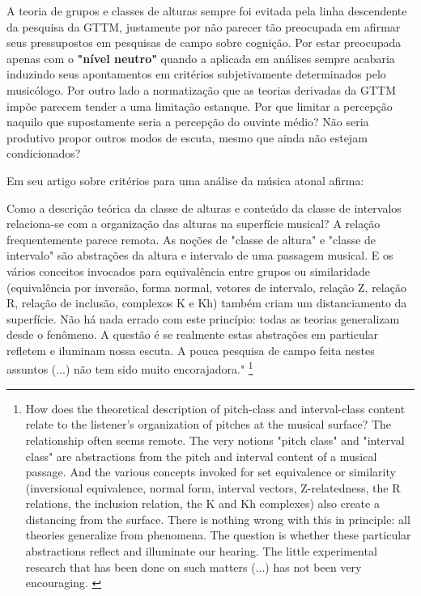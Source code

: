 \documentclass[
	12pt,				%
	openright,			%
	twoside,			%
	a4paper,			%
	english,			%
	french,				%
	spanish,			%
	brazil				%
	]{abntex2}
\begin{document}
A teoria de grupos e classes de alturas sempre foi evitada pela linha descendente da pesquisa da GTTM, justamente por não parecer tão preocupada em afirmar seus pressupostos em pesquisas de campo sobre cognição. Por estar preocupada apenas com o \textbf{"nível neutro"} quando a aplicada em análises sempre acabaria induzindo seus apontamentos em critérios subjetivamente determinados pelo musicólogo. Por outro lado a normatização que as teorias derivadas da GTTM impõe parecem tender a uma limitação estanque. Por que limitar a percepção naquilo que supostamente seria a percepção do ouvinte médio? Não seria produtivo propor outros modos de escuta, mesmo que ainda não estejam condicionados?

Em seu artigo sobre critérios para uma análise da música atonal  afirma:

\begin{citacao}
Como a descrição teórica da classe de alturas e conteúdo da classe de intervalos relaciona-se com a organização das alturas na superfície musical? A relação frequentemente parece remota. As noções de "classe de altura" e "classe de intervalo" são abstrações da altura e intervalo de uma passagem musical. E os vários conceitos invocados para equivalência entre grupos ou similaridade (equivalência por inversão, forma normal, vetores de intervalo, relação Z, relação R, relação de inclusão, complexos K e Kh) também criam um distanciamento da superfície. Não há nada errado com este princípio: todas as teorias generalizam desde o fenômeno. A questão é se realmente estas abstrações em particular refletem e iluminam nossa escuta. A pouca pesquisa de campo feita nestes assuntos (...) não tem sido muito encorajadora."\cite{lerdahl1989atonal}
\footnote{
How does the theoretical description of pitch-class and interval-class content relate to the listener's organization of pitches at the musical surface? The relationship often seems
remote. The very notions "pitch class" and "interval class" are abstractions from
the pitch and interval content of a musical passage. And the various concepts
invoked for set equivalence or similarity (inversional equivalence, normal form,
interval vectors, Z-relatedness, the R relations, the inclusion relation, the K and
Kh complexes) also create a distancing from the surface. There is nothing wrong
with this in principle: all theories generalize from phenomena. The question is
whether these particular abstractions reflect and illuminate our hearing. The little
experimental research that has been done on such matters (...) has not been very encouraging.
\cite{lerdahl1989atonal}}
\end{citacao}
\end{document}
